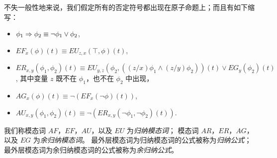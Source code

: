 不失一般性地来说，我们假定所有的否定符号都出现在原子命题上；而且有如下缩写：
\begin{itemize}
	\item $\phi_1\Rightarrow \phi_2 \equiv \neg \phi_1 \vee \phi_2$,
	\item $EF_x(\phi)(t) \equiv EU_{z,x}(\top, \phi)(t)$,
	\item $ER_{x, y}(\phi_1,\phi_2)(t) \equiv EU_{y,z}(\phi_2,((z/x)\phi_1 \wedge
	(z/y)\phi_2))(t)\vee EG_y(\phi_2)(t)$, 其中变量 $z$ 既不在 $\phi_1$，也不在 $\phi_2$ 中出现，
	\item $AG_x(\phi)(t) \equiv \neg (EF_x(\neg \phi)(t))$,
	\item $AU_{x,y}(\phi_1,\phi_2)(t) \equiv \neg (ER_{x,y}(\neg\phi_1,\neg\phi_2)(t))$.
\end{itemize}
我们称模态词 $AF$，$EF$，$AU$，以及 $EU$ 为\textit{归纳模态词}；
模态词 $AR$，$ER$，$AG$，以及 $EG$ 为\textit{余归纳模态词}。
最外层模态词为归纳模态词的公式被称为\textit{归纳公式}；
最外层模态词为余归纳模态词的公式被称为\textit{余归纳公式}。

